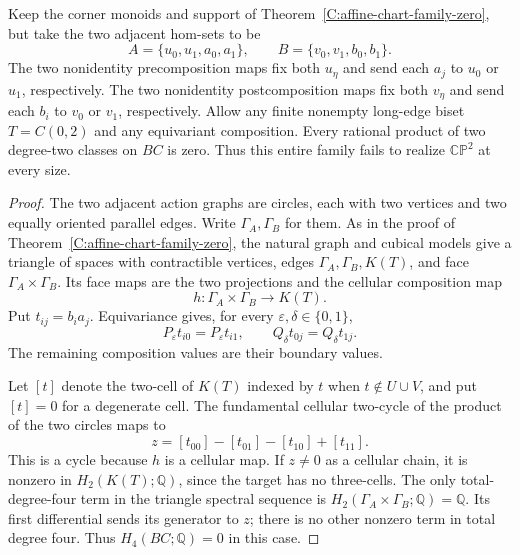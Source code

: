 \begin{theorem}
\label{C:affine-four-circle-family-zero}
Keep the corner monoids and support of
Theorem~\ref{C:affine-chart-family-zero}, but take the two
adjacent hom-sets to be
\[
 A=\{u_0,u_1,a_0,a_1\},\qquad
 B=\{v_0,v_1,b_0,b_1\}.
\]
The two nonidentity precomposition maps fix both $u_\eta$
and send each $a_j$ to $u_0$ or $u_1$, respectively.
The two nonidentity postcomposition maps fix both $v_\eta$
and send each $b_i$ to $v_0$ or $v_1$, respectively.
Allow any finite nonempty long-edge biset $T=C(0,2)$ and
any equivariant composition.  Every rational product of
two degree-two classes on $BC$ is zero.  Thus this entire
family fails to realize $\mathbb {CP}^2$ at every size.
\end{theorem}
\begin{proof}
The two adjacent action graphs are circles, each with two
vertices and two equally oriented parallel edges.  Write
$\Gamma_A,\Gamma_B$ for them.  As in the proof of
Theorem~\ref{C:affine-chart-family-zero}, the natural graph
and cubical models give a triangle of spaces with contractible
vertices, edges $\Gamma_A,\Gamma_B,K(T)$, and face
$\Gamma_A\times\Gamma_B$.  Its face maps are the two
projections and the cellular composition map
\[
 h:\Gamma_A\times\Gamma_B\longrightarrow K(T).
\]
Put $t_{ij}=b_i a_j$.  Equivariance gives, for every
$\varepsilon,\delta\in\{0,1\}$,
\begin{equation}\label{C:four-circle-boundary-equalities}
 P_\varepsilon t_{i0}=P_\varepsilon t_{i1},\qquad
 Q_\delta t_{0j}=Q_\delta t_{1j}.
\end{equation}
The remaining composition values are their boundary values.

Let $[t]$ denote the two-cell of $K(T)$ indexed by $t$ when
$t\notin U\cup V$, and put $[t]=0$ for a degenerate cell.
The fundamental cellular two-cycle of the product of the
two circles maps to
\begin{equation}\label{C:four-circle-top-chain}
 z=[t_{00}]-[t_{01}]-[t_{10}]+[t_{11}].
\end{equation}
This is a cycle because $h$ is a cellular map.  If $z\ne0$
as a cellular chain, it is nonzero in $H_2(K(T);\mathbb Q)$,
since the target has no three-cells.  The only total-degree-four
term in the triangle spectral sequence is
$H_2(\Gamma_A\times\Gamma_B;\mathbb Q)=\mathbb Q$.
Its first differential sends its generator to $z$; there
is no other nonzero term in total degree four.  Thus
$H_4(BC;\mathbb Q)=0$ in this case.


\end{proof}
